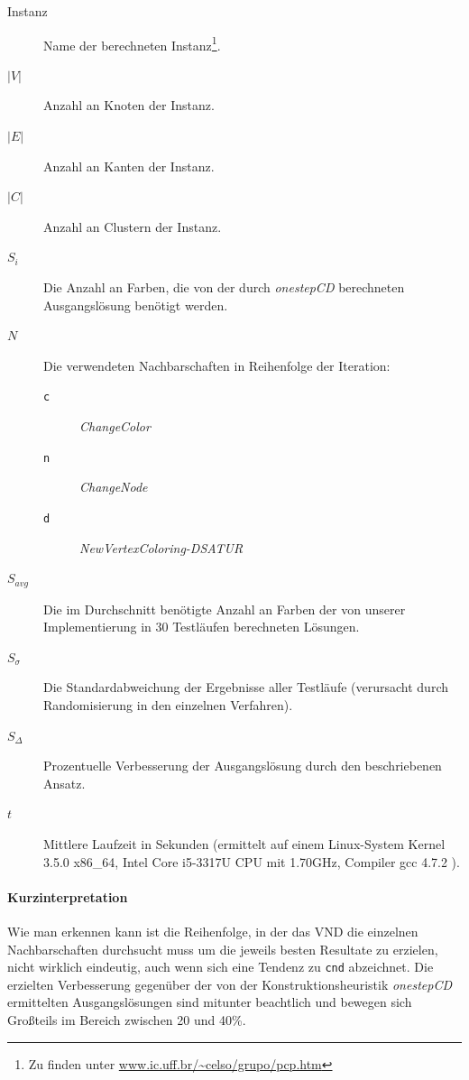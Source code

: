 \documentclass[paper=a4,fontsize=12pt]{scrartcl}
\begin{document}
\begin{description}
    \item[Instanz] Name der berechneten Instanz\footnote{Zu finden unter \url{www.ic.uff.br/~celso/grupo/pcp.htm}}.%
    \item[$|V|$] Anzahl an Knoten der Instanz.
    \item[$|E|$] Anzahl an Kanten der Instanz.
    \item[$|C|$] Anzahl an Clustern der Instanz.
    \item[$S_i$] Die Anzahl an Farben, die von der durch \emph{onestepCD} berechneten Ausgangslösung benötigt werden.
    \item[$N$] Die verwendeten Nachbarschaften in Reihenfolge der Iteration:
        \begin{description}
            \item[\texttt{c}] \emph{ChangeColor}
            \item[\texttt{n}] \emph{ChangeNode}
            \item[\texttt{d}] \emph{NewVertexColoring-DSATUR}
        \end{description}
    \item[$S_{avg}$] Die im Durchschnitt benötigte Anzahl an Farben der von unserer Implementierung in 30 Testläufen berechneten Lösungen.
    \item[$S_{\sigma}$] Die Standardabweichung der Ergebnisse aller Testläufe (verursacht durch Ran\-dom\-isier\-ung in den einzelnen Verfahren).
    \item[$S_{\Delta}$] Prozentuelle Verbesserung der Ausgangslösung durch den beschriebenen Ansatz.
    \item[$t$] Mittlere Laufzeit in Sekunden (ermittelt auf einem Linux-System Kernel 3.5.0 x86\_64, Intel Core i5-3317U CPU mit 1.70GHz, Compiler gcc 4.7.2 ).
\end{description}

\paragraph{Kurzinterpretation}{
Wie man erkennen kann ist die Reihenfolge, in der das VND die einzelnen Nachbarschaften durchsucht muss um die jeweils besten Resultate zu erzielen, nicht wirklich eindeutig, auch wenn sich eine Tendenz zu \texttt{cnd} abzeichnet. Die erzielten Verbesserung gegenüber der von der Konstruktionsheuristik \emph{onestepCD} ermittelten Ausgangslösungen sind mitunter beachtlich und bewegen sich Großteils im Bereich zwischen 20 und 40\%.}
\end{document}
